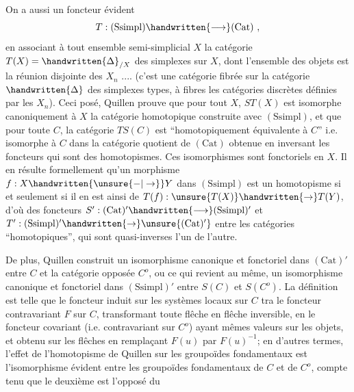 
On a aussi un foncteur évident
\[
T:(\mathrm{Ssimpl})\handwritten{\longrightarrow}(\mathrm{Cat})\ ,
\]
en associant à tout ensemble semi-simplicial $X$ la catégorie $T(X)=\handwritten{\Delta}_{/X}$ des simplexes sur $X$, dont l'ensemble des objets est la réunion disjointe des $X_n$ .... (c'est une catégorie fibrée sur la catégorie $\handwritten{\Delta}$ des simplexes types, à fibres les catégories discrètes définies par les $X_n$). Ceci posé, Quillen prouve que pour tout $X$, $ST(X)$ est isomorphe canoniquement à $X$  la catégorie homotopique construite avec $(\mathrm{Ssimpl})$, et que pour toute $C$, la catégorie $TS(C)$ est  ``homotopiquement équivalente à $C$''  i.e.  isomorphe à $C$ dans la catégorie quotient de $(\mathrm{Cat})$ obtenue en inversant les foncteurs qui sont des homotopismes.  Ces isomorphismes sont fonctoriels en $X$. Il en résulte formellement qu'un morphisme $f:X\handwritten{\unsure{-|\to}}Y$ dans $(\mathrm{Ssimpl})$ est un homotopisme si et seulement si il en est ainsi de $T(f):\unsure{T(X)}\handwritten{\to}T(Y)$, d'où des foncteurs $S':(\mathrm{Cat})'\handwritten{\longrightarrow}(\mathrm{Ssimpl})'$ et $T':(\mathrm{Ssimpl})'\handwritten{\to}\unsure{(\mathrm{Cat})'}$ entre les catégories ``homotopiques'',  qui sont quasi-inverses l'un de l'autre.

De plus, Quillen construit un isomorphisme canonique et fonctoriel dans $(\mathrm{Cat})'$ entre $C$ et la catégorie opposée $C^o$, ou ce qui revient au même, un isomorphisme canonique et fonctoriel dans $(\mathrm{Ssimpl})'$ entre $S(C)$ et $S(C^o)$.  La définition est telle que le foncteur induit sur les systèmes locaux sur $C$ tra le foncteur contravariant $F$ sur $C$, transformant toute flêche en flêche inversible, en le foncteur covariant (i.e. contravariant sur $C^o$) ayant mêmes valeurs sur les objets, et obtenu sur les flêches en remplaçant $F(u)$ par $F(u)^{-1}$; en d'autres termes, l'effet de l'homotopisme de Quillen sur les groupoïdes fondamentaux est l'isomorphisme évident entre les groupoïdes fondamentaux de $C$ et de $C^o$,  compte tenu que le deuxième est l'opposé du

